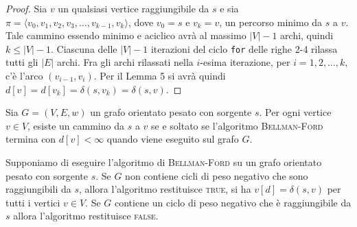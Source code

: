 \begin{proof}
	Sia $v$ un qualsiasi vertice raggiungibile da $s$ e sia $\pi = \langle v_{0}, v_{1}, v_{2}, v_{3}, \ldots, v_{k-1}, v_{k} \rangle$, dove $v_{0}=s$ e $v_{k}=v$, un percorso minimo da $s$ a $v$. Tale cammino essendo minimo e aciclico avrà al massimo $|V|-1$ archi, quindi $k \leq |V| -1$. Ciascuna delle $|V|-1$ iterazioni del ciclo \texttt{for} delle righe 2-4 rilassa tutti gli $|E|$ archi. Fra gli archi rilassati nella $i$-esima iterazione, per $i=1,2,\ldots,k$, c'è l'arco $(v_{i-1},v_{i})$. Per il Lemma 5 si avrà quindi $d[v]=d[v_{k}]=\delta(s,v_{k})=\delta(s,v)$. 
\end{proof}


\begin{corolbox}
	Sia $G=(V,E,w)$ un grafo orientato pesato con sorgente $s$. Per ogni vertice $v \in V$, esiste un cammino da $s$ a $v$ se e soltato se l'algoritmo \textsc{Bellman-Ford} termina con $d[v]<\infty$ quando viene eseguito sul grafo $G$.
\end{corolbox}

\begin{teorbox}
Supponiamo di eseguire l'algoritmo di \textsc{Bellman-Ford} su un grafo orientato pesato con sorgente $s$. Se  $G$ non contiene cicli di peso negativo che sono raggiungibili da $s$, allora l'algoritmo restituisce \textsc{true}, si ha $v[d]= \delta(s,v)$ per tutti i vertici $v \in V$. Se $G$ contiene un ciclo di peso negativo che è raggiungibile da $s$ allora l'algoritmo restituisce \textsc{false}.
\end{teorbox}

